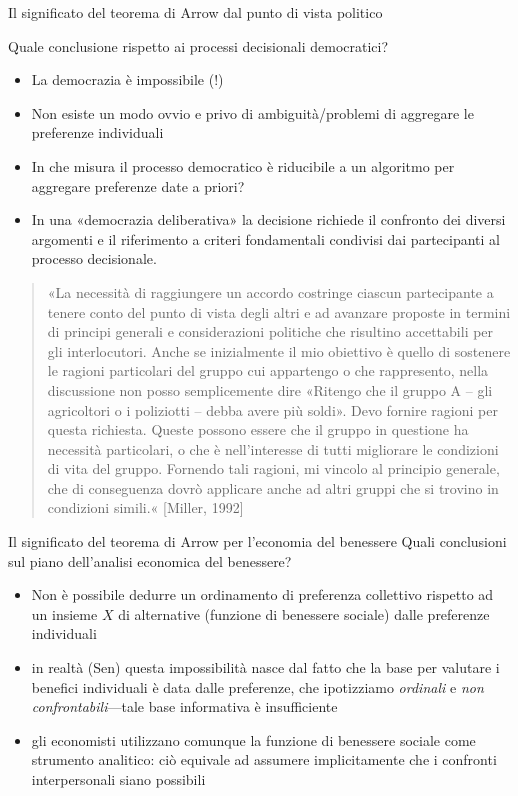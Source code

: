 \documentclass[aspectratio=64,12pt]{beamer}
\begin{document}
\begin{frame}{Il significato del teorema di Arrow dal punto di vista politico}
\begin{resize}{.9}
Quale conclusione rispetto ai processi decisionali democratici?
\begin{itemize}
\item La democrazia è impossibile (!)
\item Non esiste un modo ovvio e privo di ambiguità/problemi di aggregare le
preferenze individuali
\item In che misura il processo democratico è riducibile a un algoritmo per
aggregare preferenze date a priori?
\item In una «democrazia deliberativa» la decisione richiede il confronto dei
  diversi argomenti e il riferimento a criteri fondamentali condivisi dai
  partecipanti al processo decisionale.
\end{itemize}

\begin{quotation}
\linespread{.85}\noindent\small «La necessità di raggiungere un accordo costringe ciascun partecipante a tenere conto del punto di vista degli altri e ad avanzare proposte in termini di principi generali e considerazioni politiche che risultino accettabili per gli interlocutori. Anche se inizialmente il mio obiettivo è quello di sostenere le ragioni particolari del gruppo cui appartengo o che rappresento, nella discussione non posso semplicemente dire «Ritengo che il gruppo A -- gli agricoltori o i poliziotti -- debba avere più soldi». Devo fornire ragioni per questa richiesta. Queste possono essere che il gruppo in questione ha necessità particolari, o che è nell'interesse di tutti migliorare le condizioni di vita del gruppo. Fornendo tali ragioni, mi vincolo al principio generale, che di conseguenza dovrò applicare anche ad altri gruppi che si trovino in condizioni simili.« [Miller, 1992]
\end{quotation}
\end{resize}
\end{frame}

\begin{frame}{Il significato del teorema di Arrow per l'economia del benessere}
Quali conclusioni sul piano dell'analisi economica del benessere?
\begin{itemize}
\item Non è possibile dedurre un ordinamento di preferenza collettivo rispetto ad
un insieme $X$ di alternative (funzione di benessere sociale) dalle
preferenze individuali
\item in realtà (Sen) questa impossibilità nasce dal fatto che la base per
valutare i benefici individuali è data dalle preferenze, che ipotizziamo
\emph{ordinali} e \emph{non confrontabili}---tale base informativa è insufficiente
\item gli economisti utilizzano comunque la funzione di benessere sociale come
strumento analitico: ciò equivale ad assumere implicitamente che i confronti
interpersonali siano possibili
\end{itemize}
\end{frame}
\end{document}
